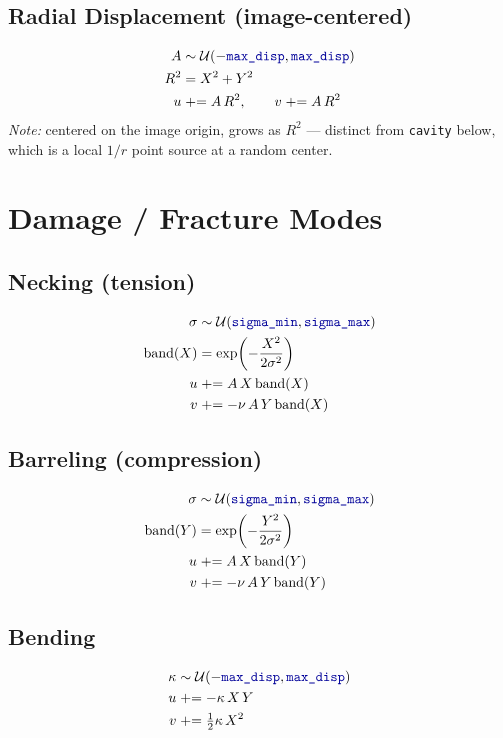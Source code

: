 \documentclass[11pt]{article}
\newcommand{\param}[1]{\texttt{\color{blue!60!black}#1}}
\begin{document}
\subsection{Radial Displacement (image-centered)}
\begin{align}
A &\sim \mathcal{U}(-\param{max\_disp}, \param{max\_disp}) \\
R^2 &= X^2 + Y^2 \\
u &\mathrel{+}= A\,R^2, \qquad v \mathrel{+}= A\,R^2
\end{align}
\emph{Note:} centered on the image origin, grows as $R^2$ — distinct from
\texttt{cavity} below, which is a local $1/r$ point source at a random center.

\section{Damage / Fracture Modes}

\subsection{Necking (tension)}
\begin{align}
\sigma &\sim \mathcal{U}(\param{sigma\_min}, \param{sigma\_max}) \\
\text{band}(X) &= \exp\!\left(-\frac{X^2}{2\sigma^2}\right) \\
u &\mathrel{+}= A\,X\,\text{band}(X) \\
v &\mathrel{+}= -\nu\,A\,Y\,\text{band}(X)
\end{align}

\subsection{Barreling (compression)}
\begin{align}
\sigma &\sim \mathcal{U}(\param{sigma\_min}, \param{sigma\_max}) \\
\text{band}(Y) &= \exp\!\left(-\frac{Y^2}{2\sigma^2}\right) \\
u &\mathrel{+}= A\,X\,\text{band}(Y) \\
v &\mathrel{+}= -\nu\,A\,Y\,\text{band}(Y)
\end{align}

\subsection{Bending}
\begin{align}
\kappa &\sim \mathcal{U}(-\param{max\_disp}, \param{max\_disp}) \\
u &\mathrel{+}= -\kappa\,X\,Y \\
v &\mathrel{+}= \tfrac{1}{2}\kappa\,X^2
\end{align}
\end{document}
